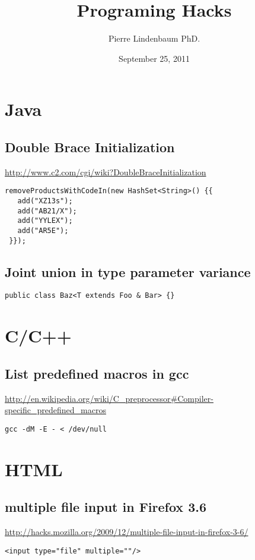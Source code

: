 \documentclass[12pt]{article}
\title{Programing Hacks}
\author{Pierre Lindenbaum PhD.}
\date{September 25, 2011}
\begin{document}
\maketitle
\section{Java}
\subsection{Double Brace Initialization}
\url{http://www.c2.com/cgi/wiki?DoubleBraceInitialization}
\begin{verbatim}
removeProductsWithCodeIn(new HashSet<String>() {{
   add("XZ13s");
   add("AB21/X");
   add("YYLEX");
   add("AR5E");
 }});
\end{verbatim}
\subsection{Joint union in type parameter variance}
\begin{verbatim}
public class Baz<T extends Foo & Bar> {}
\end{verbatim}
\section{C/C++}
\subsection{List predefined macros in gcc}
\url{http://en.wikipedia.org/wiki/C_preprocessor#Compiler-specific_predefined_macros}
\begin{verbatim}
gcc -dM -E - < /dev/null
\end{verbatim}

\section{HTML}
\subsection{multiple file input in Firefox 3.6}
\url{http://hacks.mozilla.org/2009/12/multiple-file-input-in-firefox-3-6/}
\begin{verbatim}
<input type="file" multiple=""/>
\end{verbatim}
\end{document}

